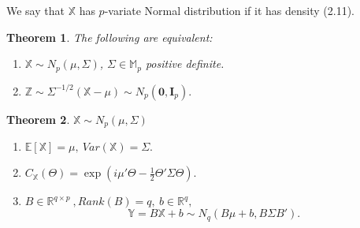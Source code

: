 \documentclass[twoside]{article}
\newcounter{lecnum}
\newtheorem{theorem}{Theorem}[lecnum]
\begin{document}
We say that $\mathbb{X}$ has $p$-variate Normal distribution if it has density (2.11).

\begin{theorem}
	The following are equivalent:
	\begin{enumerate}
		\item $\mathbb{X}\sim N_p(\mu,\Sigma)$, $\Sigma\in\mathbb{M}_p$ positive definite.
		\item $\mathbb{Z}\sim\Sigma^{-1/2}(\mathbb{X}-\mu)\sim N_p(\mathbf{0},\mathbf{I}_p).$
	\end{enumerate}
\end{theorem}

\begin{theorem}
	$\mathbb{X}\sim N_p(\mu,\Sigma)$
	\begin{enumerate}
		\item $\mathbb{E}[\mathbb{X}]=\mu,\  Var(\mathbb{X})=\Sigma.$
		\item $C_\mathbb{X}(\Theta)=\exp\left(i\mu'\Theta-\frac12\Theta'\Sigma\Theta\right).$
		\item $B\in\mathbb{R}^{q\times p}\ ,Rank(B)=q,\ b\in\mathbb{R}^q,$
		$$\mathbb{Y}=B\mathbb{X}+b\sim N_q(B\mu+b, B\Sigma B').$$
	\end{enumerate}
\end{theorem}

\end{document}
